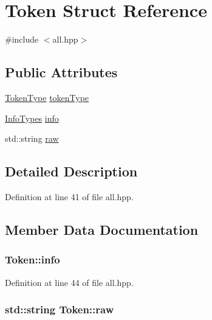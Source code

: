 \hypertarget{struct_token}{}\section{Token Struct Reference}
\label{struct_token}


{\ttfamily \#include $<$all.\+hpp$>$}

\subsection*{Public Attributes}
\begin{DoxyCompactItemize}
\item 
\hyperlink{types_2arch_8hpp_aa520fbf142ba1e7e659590c07da31921}{Token\+Type} \hyperlink{struct_token_a3d2b3146021ae2acd9e1b33bf5e59c78}{token\+Type}
\item 
\hyperlink{types_2all_8hpp_a58b4bafc5e94cba5e42b944a85b061db}{Info\+Types} \hyperlink{struct_token_a4c338f6ca199f4a8575e877d36d03a06}{info}
\item 
std\+::string \hyperlink{struct_token_ad77981ec051c2380c38459f8c4392dad}{raw}
\end{DoxyCompactItemize}


\subsection{Detailed Description}


Definition at line 41 of file all.\+hpp.



\subsection{Member Data Documentation}
\hypertarget{struct_token_a4c338f6ca199f4a8575e877d36d03a06}{}
\subsubsection[{info}]{ Token\+::info}\label{struct_token_a4c338f6ca199f4a8575e877d36d03a06}


Definition at line 44 of file all.\+hpp.

\hypertarget{struct_token_ad77981ec051c2380c38459f8c4392dad}{}
\subsubsection[{raw}]{\setlength{\rightskip}{0pt plus 5cm}std\+::string Token\+::raw}\label{struct_token_ad77981ec051c2380c38459f8c4392dad}


